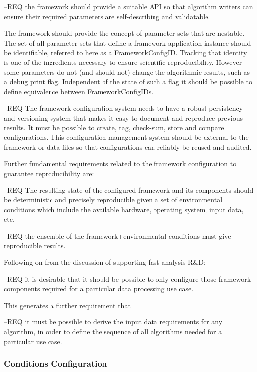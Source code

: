 \documentclass[../main-v1.tex]{subfiles}
\begin{document}
--REQ the framework should provide a suitable API so that algorithm writers can ensure their required parameters are self-describing and validatable.

The framework should provide the concept of parameter sets that are nestable.  The set of all parameter sets that define a framework application instance should be identifiable, referred to here as a FrameworkConfigID.  Tracking that identity is one of the ingredients necessary to ensure scientific reproducibility.  However some parameters do not (and should not) change the algorithmic results, such as a debug print flag.  Independent of the state of such a flag it should be possible to define equivalence between FrameworkConfigIDs.

--REQ The framework configuration system needs to have a robust persistency and versioning system that makes it easy to document and reproduce previous results.  It must be possible to create, tag, check-sum, store and compare configurations.  This configuration management system should be external to the framework or data files so that configurations can reliably be reused and audited.  

Further fundamental requirements related to the framework configuration to guarantee reproducibility are:

--REQ The resulting state of the configured framework and its components should be deterministic and precisely reproducible given a set of environmental conditions which include the available hardware, operating system, input data, etc.  

--REQ the ensemble of the framework+environmental conditions must give reproducible results.  

Following on from the discussion of supporting fast analysis R\&D:

--REQ it is desirable that it should be possible to only configure those framework components required for a particular data processing use case.  

This generates a further requirement that 

--REQ it must be possible to derive the input data requirements for any algorithm, in order to define the sequence of all algorithms needed for a particular use case.
 
\subsubsection{Conditions Configuration}
\end{document}
